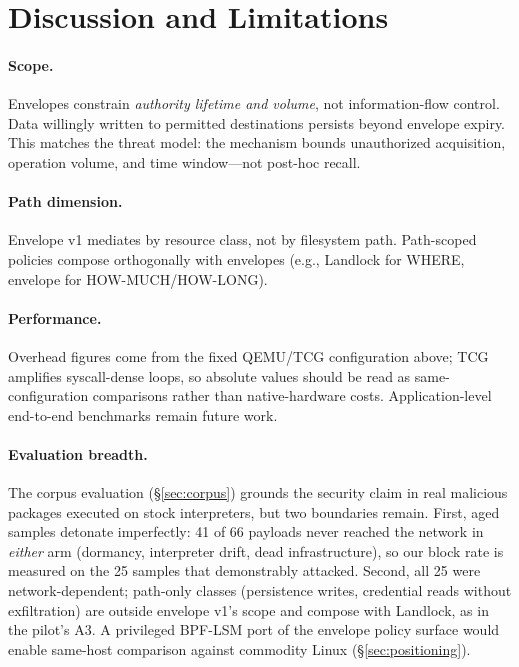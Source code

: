 \documentclass[letterpaper,twocolumn,10pt]{article}
\begin{document}
\section{Discussion and Limitations}
\label{sec:discussion}

\paragraph{Scope.}
Envelopes constrain \emph{authority lifetime and volume}, not
information-flow control.  Data willingly written to permitted
destinations persists beyond envelope expiry.  This matches the threat
model: the mechanism bounds unauthorized acquisition, operation
volume, and time window---not post-hoc recall.

\paragraph{Path dimension.}
Envelope v1 mediates by resource class, not by filesystem path.
Path-scoped policies compose orthogonally with envelopes (e.g.,
Landlock for WHERE, envelope for HOW-MUCH/HOW-LONG).

\paragraph{Performance.}
Overhead figures come from the fixed QEMU/TCG configuration above;
TCG amplifies syscall-dense loops, so absolute values should be read
as same-configuration comparisons rather than native-hardware costs.
Application-level end-to-end benchmarks remain future work.

\paragraph{Evaluation breadth.}
The corpus evaluation (\S\ref{sec:corpus}) grounds the security claim
in real malicious packages executed on stock interpreters, but two
boundaries remain.  First, aged samples detonate imperfectly: 41 of 66
payloads never reached the network in \emph{either} arm (dormancy,
interpreter drift, dead infrastructure), so our block rate is measured
on the 25 samples that demonstrably attacked.  Second, all 25 were
network-dependent; path-only classes (persistence writes, credential
reads without exfiltration) are outside envelope v1's scope and compose
with Landlock, as in the pilot's A3.  A privileged BPF-LSM port of the
envelope policy surface would enable same-host comparison against
commodity Linux (\S\ref{sec:positioning}).
\end{document}
